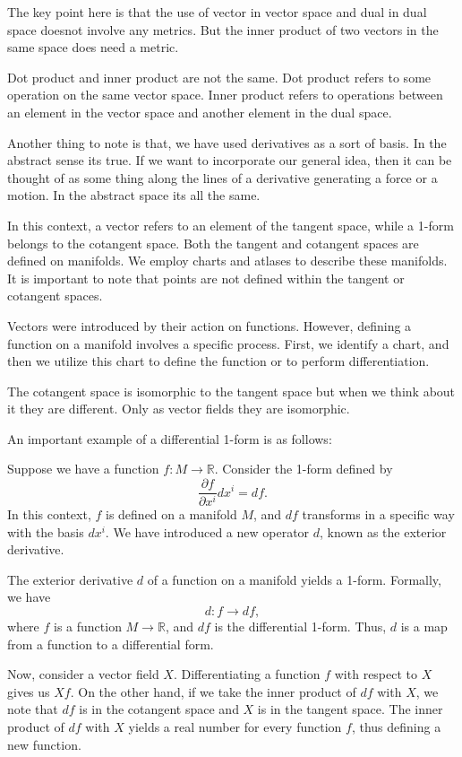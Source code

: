 \documentclass{article}
\begin{document}
The key point here is that the use of vector in vector space and dual in dual space doesnot involve any metrics. But the inner product of two vectors in the same space does need a metric. 

Dot product and inner product are not the same. Dot product refers to some operation on the same vector space. Inner product refers to operations between an element in the vector space and another element in the dual space. 

Another thing to note is that, we have used derivatives as a sort of basis. In the abstract sense its true. If we want to incorporate our general idea, then it can be thought of as some thing along the lines of a derivative generating a force or a motion. In the abstract space its all the same. 

In this context, a vector refers to an element of the tangent space, while a 1-form belongs to the cotangent space. Both the tangent and cotangent spaces are defined on manifolds. We employ charts and atlases to describe these manifolds. It is important to note that points are not defined within the tangent or cotangent spaces.

Vectors were introduced by their action on functions. However, defining a function on a manifold involves a specific process. First, we identify a chart, and then we utilize this chart to define the function or to perform differentiation.

The cotangent space is isomorphic to the tangent space but when we think about it they are different. Only as vector fields they are isomorphic. 

An important example of a differential 1-form is as follows:

Suppose we have a function \( f: M \to \mathbb{R} \). Consider the 1-form defined by
\[
\frac{\partial f}{\partial x^i} dx^i = df.
\]
In this context, \( f \) is defined on a manifold \( M \), and \( df \) transforms in a specific way with the basis \( dx^i \). We have introduced a new operator \( d \), known as the exterior derivative.

The exterior derivative \( d \) of a function on a manifold yields a 1-form. Formally, we have
\[
d: f \to df,
\]
where \( f \) is a function \( M \to \mathbb{R} \), and \( df \) is the differential 1-form. Thus, \( d \) is a map from a function to a differential form.

Now, consider a vector field \( X \). Differentiating a function \( f \) with respect to \( X \) gives us \( Xf \). On the other hand, if we take the inner product of \( df \) with \( X \), we note that \( df \) is in the cotangent space and \( X \) is in the tangent space. The inner product of \( df \) with \( X \) yields a real number for every function \( f \), thus defining a new function.
\end{document}
